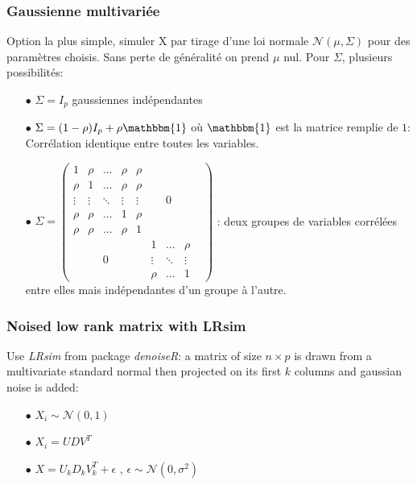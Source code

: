 \documentclass[12pt, a4paper]{article}
\begin{document}
\subsubsection{Gaussienne multivariée}
Option la plus simple, simuler X par tirage d'une loi normale $\mathcal{N}(\mu, \Sigma)$ pour des paramètres choisis. Sans perte de généralité on prend $\mu$ nul. Pour $\Sigma$, plusieurs possibilités:
\begin{itemize}
\item[$\bullet$]	$\Sigma = I_p$ gaussiennes indépendantes
\item[$\bullet$] $\Sigma = (1-\rho) I_p + \rho \mathbbm{1}$ où $\mathbbm{1}$ est la matrice remplie de $1$: Corrélation identique entre toutes les variables.
\item[$\bullet$] $\Sigma = 
\begin{pmatrix}
1 & \rho & \ldots & \rho & \rho & & & & \\
\rho & 1 & \ldots & \rho & \rho & & & & \\
\vdots & \vdots & \ddots & \vdots & \vdots & & 0 & & \\
\rho & \rho & \ldots & 1 & \rho & & & & \\
\rho & \rho & \ldots & \rho & 1 & & & & \\

& & & & & 1 & \ldots & \rho \\
& & 0 & & & \vdots & \ddots & \vdots \\
& & & & & \rho & \ldots & 1  
\end{pmatrix}
$ : deux groupes de variables corrélées entre elles mais indépendantes d'un groupe à l'autre.
\end{itemize}

\subsubsection{Noised low rank matrix with LRsim}
Use \emph{LRsim} from package \emph{denoiseR}: a matrix of size $n \times p$ is drawn from a multivariate standard normal then projected on its first $k$ columns and gaussian noise is added:
\begin{itemize}
\item[$\bullet$] $X_i \sim \mathcal{N}(0,1)$
\item[$\bullet$] $ X_i = U D V^T$
\item[$\bullet$] $X = U_k D_k V_k^T + \epsilon $ , $\epsilon \sim \mathcal{N}(0,\sigma^2)$
\end{itemize} 
\end{document}
